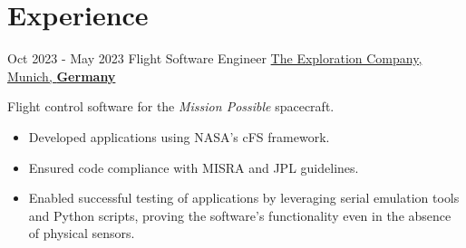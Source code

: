 \documentclass[letterpaper]{twentysecondcv} %
\begin{document}
\makeprofile %

%
%
\section{Experience}

\begin{twenty} %

    \twentyitem
        {Oct 2023 -}
        {May 2023}
        {Flight Software Engineer}
        {\href{https://www.exploration.space/}{The Exploration Company, Munich, \textbf{Germany}}}
        {}
        {
            Flight control software for the \textit{Mission Possible} spacecraft.
            \vspace{1 mm}
            \begin{itemize}
                \item Developed applications  using NASA's cFS framework.
                \item Ensured code compliance with MISRA and JPL guidelines.
                \item Enabled successful testing of applications by leveraging serial emulation tools and Python scripts, proving the software's functionality even in the absence of physical sensors.
            \end{itemize}

}
\end{twenty}
\end{document}
